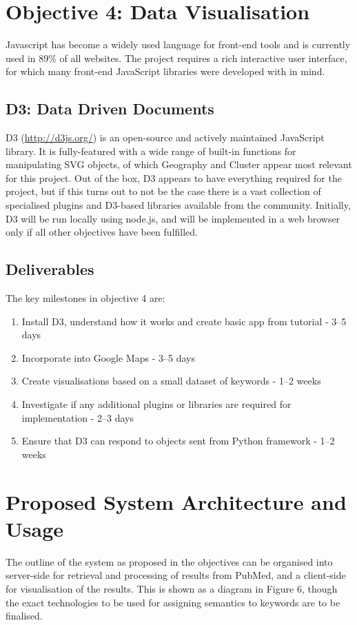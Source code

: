 \documentclass[PROP_AGutteridge_CS.tex]{subfiles}
\begin{document}
\section{Objective 4: Data Visualisation}
Javascript has become a widely used language for front-end tools and is currently used in 89\% of all websites\cite{w3}. The project requires a rich interactive user interface, for which many front-end JavaScript libraries were developed with in mind.  

\subsection{D3: Data Driven Documents}
D3 (\url{http://d3js.org/}) is an open-source and actively maintained JavaScript library. It is fully-featured with a wide range of built-in functions for manipulating SVG objects, of which Geography and Cluster appear most relevant for this project. Out of the box, D3 appears to have everything required for the project, but if this turns out to not be the case there is a vast collection of specialised plugins and D3-based libraries available from the community. Initially, D3 will be run locally using node.js, and will be implemented in a web browser only if all other objectives have been fulfilled.

\subsection{Deliverables}
The key milestones in objective 4 are:
\begin{enumerate}
\item{Install D3, understand how it works and create basic app from tutorial - 3--5 days}
\item{Incorporate into Google Maps - 3--5 days}
\item{Create visualisations based on a small dataset of keywords - 1--2 weeks}
\item{Investigate if any additional plugins or libraries are required for implementation - 2--3 days}
\item{Ensure that D3 can respond to objects sent from Python framework - 1--2 weeks}
\end{enumerate}

\section{Proposed System Architecture and Usage}
The outline of the system as proposed in the objectives can be organised into server-side for retrieval and processing of results from PubMed, and a client-side for visualisation of the results. This is shown as a diagram in Figure 6, though the exact technologies to be used for assigning semantics to keywords are to be finalised.
\end{document}
